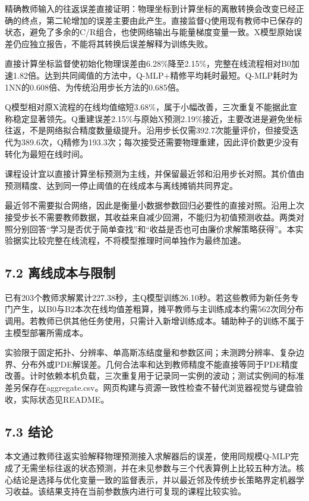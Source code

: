 \documentclass[UTF8,a4paper,zihao=5,fontset=fandol]{ctexart}
\begin{document}
精确教师输入的往返误差直接证明：物理坐标到计算坐标的离散转换会改变已经正确的终点，第二轮增加的误差主要由此产生。直接监督Q使用现有教师中已保存的状态，避免了多余的C/R组合，也使网络输出与能量梯度变量一致。X模型原始误差仍应独立报告，不能将其转换后误差解释为训练失败。


直接计算坐标监督使初始化物理误差由6.28\%降至2.15\%，完整在线流程相对B0加速1.82倍。达到共同阈值的方法中，Q-MLP+精修平均耗时最短。Q-MLP耗时为1NN的0.608倍、为传统沿用步长方法的0.685倍。


Q模型相对原X流程的在线均值缩短3.68\%，属于小幅改善，三次重复不能据此宣称稳定显著领先。Q重建误差2.15\%与原始X预测2.19\%接近，主要改进是避免坐标往返，不是网络拟合精度数量级提升。沿用步长仅需392.7次能量评价，但接受迭代为389.6次，Q精修为193.3次；每次接受还需要物理重建，因此评价数更少没有转化为最短在线时间。


课程设计宜以直接计算坐标预测为主线，并保留最近邻和沿用步长对照。其价值由预测精度、达到同一停止阈值的在线成本与离线摊销共同界定。


最近邻不需要拟合网络，因此是衡量小数据参数回归必要性的直接对照。沿用上次接受步长不需要教师数据，其收益来自减少回溯，不能归为初值预测收益。两类对照分别回答“学习是否优于简单查找”和“收益是否也可由廉价求解策略获得”。本实验据实比较完整在线流程，不将模型推理时间单独作为最终加速。


\subsection*{7.2 离线成本与限制}

已有203个教师求解累计227.38秒，主Q模型训练26.10秒。若这些教师为新任务专门产生，以B0与B2本次在线均值差粗算，摊平教师与主训练成本约需562次同分布调用。若教师已供其他任务使用，只需计入新增训练成本。辅助种子的训练不属于主模型部署所需成本。


实验限于固定拓扑、分辨率、单高斯冻结度量和参数区间；未测跨分辨率、复杂边界、分布外或PDE解误差。几何合法率和达到教师精度不能直接等同于PDE精度改善。计时依赖本机负载，三次重复用于记录同一实例的波动；测试实例间的标准差另保存在aggregate.csv。网页构建与资源一致性检查不替代浏览器视觉与键盘验收，实际状态见README。


\subsection*{7.3 结论}

本文通过教师往返实验解释物理预测接入求解器后的误差，使用同规模Q-MLP完成了无需坐标往返的状态预测，并在未见参数与三个代表算例上比较五种方法。核心结论是选择与优化变量一致的监督表示，并以最近邻及传统步长策略界定机器学习收益。该结果支持在当前参数族内进行可复现的课程比较实验。
\end{document}
